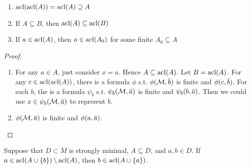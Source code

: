\documentclass[11pt]{article}
\begin{document}
\begin{lemma}[]
\begin{enumerate}
\item \(\operatorname{acl}(\operatorname{acl}(A))=\operatorname{acl}(A)\supseteq A\)
\item If \(A\subseteq B\), then \(\operatorname{acl}(A)\subseteq\operatorname{acl}(B)\)
\item If \(a\in\operatorname{acl}(A)\), then \(a\in\operatorname{acl}(A_0)\) for some finite \(A_0\subseteq A\)
\end{enumerate}
\end{lemma}

\begin{proof}
\begin{enumerate}
\item For any \(a\in A\), just consider \(x=a\). Hence \(A\subseteq\operatorname{acl}(A)\). Let \(B=\operatorname{acl}(A)\). For
any \(c\in\operatorname{acl}(\operatorname{acl}(A))\), there is a formula \(\phi\) s.t. \(\phi(\calm,\barb)\) is finite
and \(\phi(c,\barb)\). For each \(b\), the is a formula \(\psi_b\) s.t. \(\psi_b(\calm,\bara)\) is finite
and \(\psi_b(b,\bara)\). Then we could use \(x\in\psi_b(\calm,\bara)\) to represent \(b\).
\setcounter{enumi}{2}
\item \(\phi(\calm,\bara)\) is finite and \(\phi(a,\bara)\).
\end{enumerate}
\end{proof}

\begin{lemma}
\label{lemma6.1.4}
Suppose that \(D\subset M\) is strongly minimal, \(A\subseteq D\), and \(a,b\in D\).
If \(a\in\operatorname{acl}(A\cup\{b\})\setminus\operatorname{acl}(A)\), then \(b\in\operatorname{acl}(A\cup\{a\})\).
\end{lemma}

\end{document}
